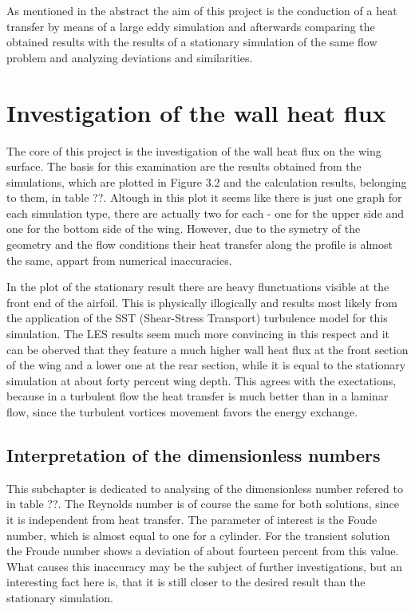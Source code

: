 As mentioned in the abstract the aim of this project is the conduction of a heat transfer by means of a large eddy simulation and afterwards comparing the obtained results with the results of a stationary simulation of the same flow problem and analyzing deviations and similarities.
\section{Investigation of the wall heat flux}
The core of this project is the investigation of the wall heat flux on the wing surface. The basis for this examination are the results obtained from the simulations, which are plotted in Figure 3.2 and the calculation results, belonging to them, in table ??. Altough in this plot it seems like there is just one graph for each simulation type, there are actually two for each - one for the upper side and one for the bottom side of the wing. However, due to the symetry of the geometry and the flow conditions their heat transfer along the profile is almost the same, appart from numerical inaccuracies.
	
In the plot of the stationary result there are heavy flunctuations visible at the front end of the airfoil. This is physically illogically and results most likely from the application of the SST (Shear-Stress Transport) turbulence model for this simulation. The LES results seem much more convincing in this respect and it can be oberved that they feature a much higher wall heat flux at the front section of the wing and a lower one at the rear section, while it is equal to the stationary simulation at about forty percent wing depth. This agrees with the exectations, because in a turbulent flow the heat transfer is much better than in a laminar flow, since the turbulent vortices movement favors the energy exchange.
\subsection{Interpretation of the dimensionless numbers}
This subchapter is dedicated to analysing of the dimensionless number refered to in table ??. The Reynolds number is of course the same for both solutions, since it is independent from heat transfer.
The parameter of interest is the Foude number, which is almost equal to one for a cylinder. For the transient solution the Froude number shows a deviation of about fourteen percent from this value. What causes this inaccuracy may be the subject of further investigations, but an interesting fact here is, that it is still closer to the desired result than the stationary simulation.
